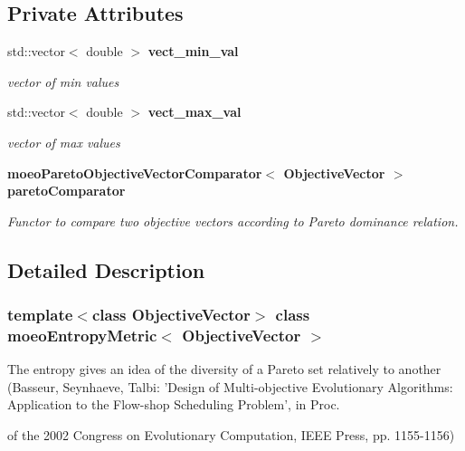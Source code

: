 \subsection*{Private Attributes}
\begin{CompactItemize}
\item 
std::vector$<$ double $>$ \bf{vect\_\-min\_\-val}\label{classmoeoEntropyMetric_e423d7d4416ef371ce7b0fd24c3212f8}

\begin{CompactList}\small\item\em vector of min values \item\end{CompactList}\item 
std::vector$<$ double $>$ \bf{vect\_\-max\_\-val}\label{classmoeoEntropyMetric_f5fad6d144520fd1403f774f98b18b99}

\begin{CompactList}\small\item\em vector of max values \item\end{CompactList}\item 
\bf{moeo\-Pareto\-Objective\-Vector\-Comparator}$<$ \bf{Objective\-Vector} $>$ \bf{pareto\-Comparator}\label{classmoeoEntropyMetric_227ce550253c35957300c6e11730c847}

\begin{CompactList}\small\item\em Functor to compare two objective vectors according to Pareto dominance relation. \item\end{CompactList}\end{CompactItemize}


\subsection{Detailed Description}
\subsubsection*{template$<$class Objective\-Vector$>$ class moeo\-Entropy\-Metric$<$ Objective\-Vector $>$}

The entropy gives an idea of the diversity of a Pareto set relatively to another (Basseur, Seynhaeve, Talbi: 'Design of Multi-objective Evolutionary Algorithms: Application to the Flow-shop Scheduling Problem', in Proc. 

of the 2002 Congress on Evolutionary Computation, IEEE Press, pp. 1155-1156) 



